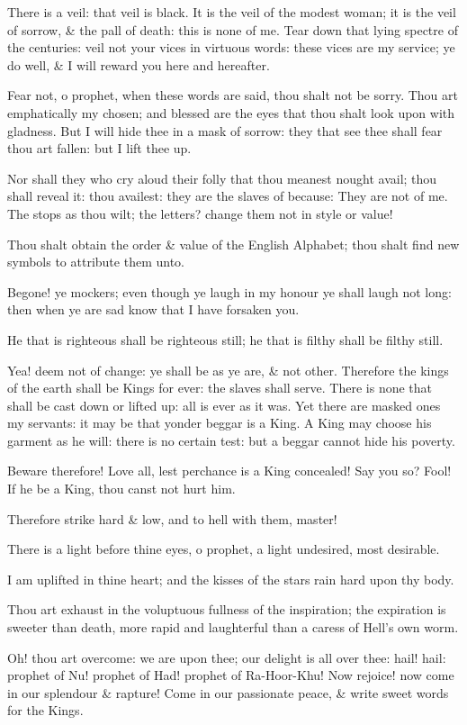 There is a veil: that veil is black. It is the veil of the modest woman; it is the veil of sorrow, \& the pall of death: this is none of me. Tear down that lying spectre of the centuries: veil not your vices in virtuous words: these vices are my service; ye do well, \& I will reward you here and hereafter.

Fear not, o prophet, when these words are said, thou shalt not be sorry. Thou art emphatically my chosen; and blessed are the eyes that thou shalt look upon with gladness. But I will hide thee in a mask of sorrow: they that see thee shall fear thou art fallen: but I lift thee up.

Nor shall they who cry aloud their folly that thou meanest nought avail; thou shall reveal it: thou availest: they are the slaves of because: They are not of me. The stops as thou wilt; the letters? change them not in style or value!

Thou shalt obtain the order \& value of the English Alphabet; thou shalt find new symbols to attribute them unto.

Begone! ye mockers; even though ye laugh in my honour ye shall laugh not long: then when ye are sad know that I have forsaken you.

He that is righteous shall be righteous still; he that is filthy shall be filthy still.

Yea! deem not of change: ye shall be as ye are, \& not other. Therefore the kings of the earth shall be Kings for ever: the slaves shall serve. There is none that shall be cast down or lifted up: all is ever as it was. Yet there are masked ones my servants: it may be that yonder beggar is a King. A King may choose his garment as he will: there is no certain test: but a beggar cannot hide his poverty.

Beware therefore! Love all, lest perchance is a King concealed! Say you so? Fool! If he be a King, thou canst not hurt him.

Therefore strike hard \& low, and to hell with them, master!

There is a light before thine eyes, o prophet, a light undesired, most desirable.

I am uplifted in thine heart; and the kisses of the stars rain hard upon thy body.

Thou art exhaust in the voluptuous fullness of the inspiration; the expiration is sweeter than death, more rapid and laughterful than a caress of Hell's own worm.

Oh! thou art overcome: we are upon thee; our delight is all over thee: hail! hail: prophet of Nu! prophet of Had! prophet of Ra-Hoor-Khu! Now rejoice! now come in our splendour \& rapture! Come in our passionate peace, \& write sweet words for the Kings.

